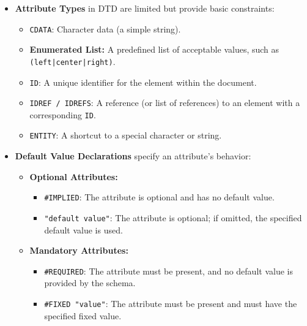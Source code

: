 \documentclass{scrbook}
\begin{document}
\begin{itemize}
    \item
    \textbf{Attribute Types} in DTD are limited but provide basic constraints:
    \begin{itemize}
        \item 
        \texttt{CDATA}: Character data (a simple string).

        \item 
        \textbf{Enumerated List:} A predefined list of acceptable values, such as \texttt{(left|center|right)}.

        \item 
        \texttt{ID}: A unique identifier for the element within the document.

        \item 
        \texttt{IDREF / IDREFS}: A reference (or list of references) to an element with a corresponding \texttt{ID}.

        \item 
        \texttt{ENTITY}: A shortcut to a special character or string.
    \end{itemize}

    \item 
    \textbf{Default Value Declarations} specify an attribute's behavior:
    \begin{itemize}
        \item \textbf{Optional Attributes:}
        \begin{itemize}
            \item \texttt{\#IMPLIED}: The attribute is optional and has no default value.

            \item \texttt{"default value"}: The attribute is optional; if omitted, the specified default value is used.
        \end{itemize}

        \item \textbf{Mandatory Attributes:}
        \begin{itemize}
            \item \texttt{\#REQUIRED}: The attribute must be present, and no default value is provided by the schema.

            \item \texttt{\#FIXED "value"}: The attribute must be present and must have the specified fixed value.
        \end{itemize}
    \end{itemize}
\end{itemize}
\end{document}
